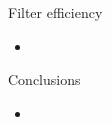 \documentclass[8pt]{beamer}
\begin{document}
\begin{frame}{Filter efficiency}

\begin{block}{}
  
\begin{itemize}
  \item 
\end{itemize}

\end{block}

\end{frame}

\begin{frame}{Conclusions}

\begin{block}{}
  
\begin{itemize}
  \item 
\end{itemize}

\end{block}

\end{frame}
\end{document}
